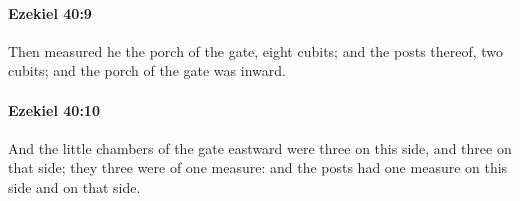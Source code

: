 		\paragraph{Ezekiel 40:9} %
			\label{EZEKIEL-40-9}

			Then measured he the porch of the gate, eight cubits; and the posts thereof, two cubits; and the porch of the gate was inward.


		\paragraph{Ezekiel 40:10} %
			\label{EZEKIEL-40-10}

			And the little chambers of the gate eastward were three on this side, and three on that side; they three were of one measure: and the posts had one measure on this side and on that side.


